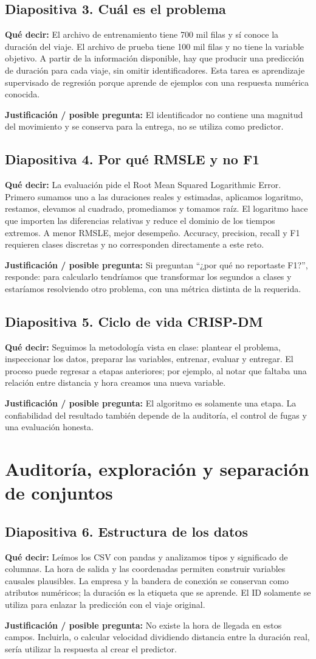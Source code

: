 \documentclass[11pt,letterpaper]{article}
\newcommand{\lamina}[2]{\subsection*{Diapositiva #1. #2}}
\newcommand{\explica}[1]{\noindent\textcolor{azul}{\textbf{Qué decir:}} #1\par\smallskip}
\newcommand{\defiende}[1]{\noindent\textcolor{verde}{\textbf{Justificación / posible pregunta:}} #1\par\medskip}
\begin{document}
\lamina{3}{Cuál es el problema}
\explica{El archivo de entrenamiento tiene 700 mil filas y sí conoce la duración del viaje. El archivo de prueba tiene 100 mil filas y no tiene la variable objetivo. A partir de la información disponible, hay que producir una predicción de duración para cada viaje, sin omitir identificadores. Esta tarea es aprendizaje supervisado de regresión porque aprende de ejemplos con una respuesta numérica conocida.}
\defiende{El identificador no contiene una magnitud del movimiento y se conserva para la entrega, no se utiliza como predictor.}

\lamina{4}{Por qué RMSLE y no F1}
\explica{La evaluación pide el Root Mean Squared Logarithmic Error. Primero sumamos uno a las duraciones reales y estimadas, aplicamos logaritmo, restamos, elevamos al cuadrado, promediamos y tomamos raíz. El logaritmo hace que importen las diferencias relativas y reduce el dominio de los tiempos extremos. A menor RMSLE, mejor desempeño. Accuracy, precision, recall y F1 requieren clases discretas y no corresponden directamente a este reto.}
\defiende{Si preguntan ``¿por qué no reportaste F1?'', responde: para calcularlo tendríamos que transformar los segundos a clases y estaríamos resolviendo otro problema, con una métrica distinta de la requerida.}

\lamina{5}{Ciclo de vida CRISP-DM}
\explica{Seguimos la metodología vista en clase: plantear el problema, inspeccionar los datos, preparar las variables, entrenar, evaluar y entregar. El proceso puede regresar a etapas anteriores; por ejemplo, al notar que faltaba una relación entre distancia y hora creamos una nueva variable.}
\defiende{El algoritmo es solamente una etapa. La confiabilidad del resultado también depende de la auditoría, el control de fugas y una evaluación honesta.}

\section{Auditoría, exploración y separación de conjuntos}
\lamina{6}{Estructura de los datos}
\explica{Leímos los CSV con pandas y analizamos tipos y significado de columnas. La hora de salida y las coordenadas permiten construir variables causales plausibles. La empresa y la bandera de conexión se conservan como atributos numéricos; la duración es la etiqueta que se aprende. El ID solamente se utiliza para enlazar la predicción con el viaje original.}
\defiende{No existe la hora de llegada en estos campos. Incluirla, o calcular velocidad dividiendo distancia entre la duración real, sería utilizar la respuesta al crear el predictor.}
\end{document}

